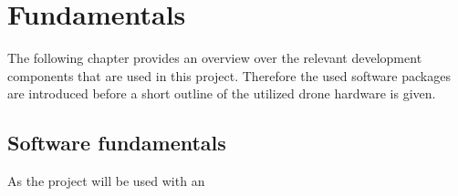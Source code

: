 \graphicspath{{./figures/}}
\chapter{Fundamentals} 
The following chapter provides an overview over the relevant development 
components that are used in this project.
Therefore the used software packages are introduced before a short outline of
the utilized drone hardware is given.

\section{Software fundamentals}
\label{sec:2_software_fund}
As the project will be used with an 
